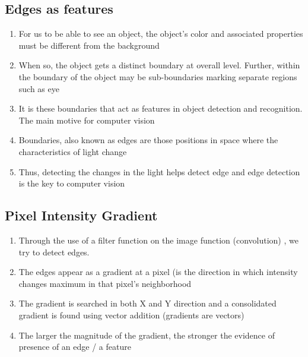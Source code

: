 \documentclass[]{article}
\begin{document}
\subsection{Edges as features}
\begin{enumerate}
\item For us to be able to see an object, the object’s color and associated properties 
must be different from the background
\item When so, the object gets a distinct boundary at overall level. Further, within the 
boundary of the object may be sub-boundaries marking separate regions such as eye
\item It is these boundaries that act as features in object detection and recognition. The main 
motive for computer vision
\item Boundaries, also known as edges are those positions in space where the characteristics 
of light change
\item Thus, detecting the changes in the light helps detect edge and edge detection is the key 
to computer vision
\end{enumerate}
\subsection{Pixel Intensity Gradient} 
\begin{enumerate}
\item Through the use of a filter function on the image function (convolution) , we try to 
detect edges. 
\item The edges appear as a gradient at a pixel (is the direction in which intensity 
changes maximum in that pixel’s neighborhood
\item The gradient is searched in both X and Y direction and a consolidated gradient is 
found using vector addition (gradients are vectors)
\item The larger the magnitude of the gradient, the stronger the evidence of presence 
of an edge / a feature
\end{enumerate}
\end{document}
